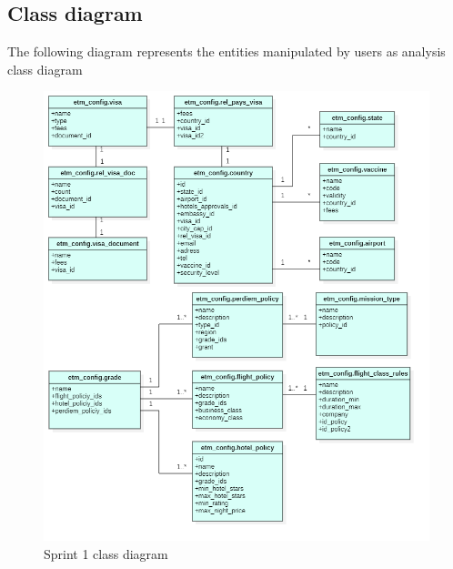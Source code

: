     \subsection{Class diagram}
    The following diagram represents the entities manipulated by users as
analysis class diagram
    \begin{figure}[H]
    \begin{center}
        \includegraphics[scale=0.5]{img/sprint1_class.png}
        \caption{Sprint 1 class diagram}
    \end{center}
     \label{fig:my_label}
\end{figure}
